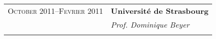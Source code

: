 \begin{tabular}{rl}
\textsc{October 2011--Fevrier 2011}  &  \textbf{Université de Strasbourg} \\
&  \emph{Prof. Dominique Beyer} \\
&\\

%

\end{tabular}

